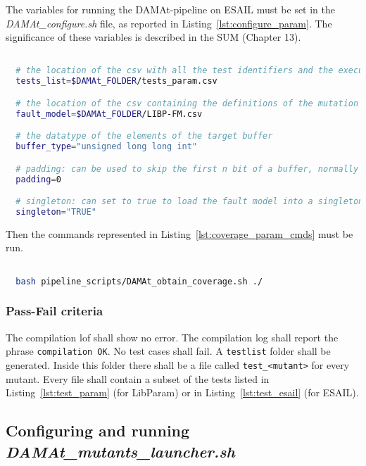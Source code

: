 The variables for running the DAMAt-pipeline on ESAIL must be set in the \emph{DAMAt\_configure.sh} file, as reported in Listing~\ref{lst:configure_param}. The significance of these variables is described in the SUM (Chapter 13).

  \begin{lstlisting}[language=bash, label={lst:configure_param}]

  # the location of the csv with all the test identifiers and the execution time
  tests_list=$DAMAt_FOLDER/tests_param.csv

  # the location of the csv containing the definitions of the mutation operators
  fault_model=$DAMAt_FOLDER/LIBP-FM.csv

  # the datatype of the elements of the target buffer
  buffer_type="unsigned long long int"

  # padding: can be used to skip the first n bit of a buffer, normally set to 0
  padding=0

  # singleton: can set to true to load the fault model into a singleton variable, normally set to "TRUE", can also  be set to "FALSE"
  singleton="TRUE"

  \end{lstlisting}

Then the commands represented in Listing~\ref{lst:coverage_param_cmds} must be run.

  \begin{lstlisting}[language=bash, label={lst:coverage_param_cmds}]

  bash pipeline_scripts/DAMAt_obtain_coverage.sh ./

  \end{lstlisting}

\subsubsection{Pass-Fail criteria}

The compilation lof shall show no error.
The compilation log shall report the phrase \texttt{compilation OK}.
No test cases shall fail.
A \texttt{testlist} folder shall be generated. Inside this folder there shall be a file called \texttt{test\_<mutant>} for every mutant.
Every file shall contain a subset of the tests listed in Listing~\ref{lst:test_param} (for LibParam) or in Listing~\ref{lst:test_esail} (for ESAIL).

\subsection{Configuring and running \emph{DAMAt\_mutants\_launcher.sh}}

